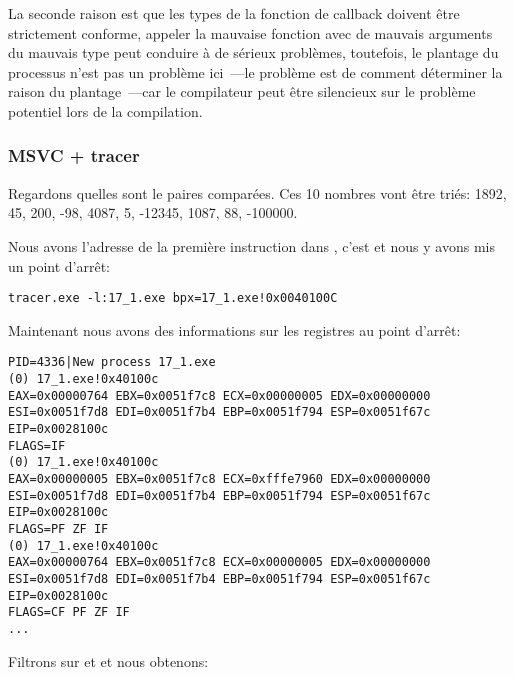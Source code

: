 La seconde raison est que les types de la fonction de callback doivent être strictement
conforme, appeler la mauvaise fonction avec de mauvais arguments du mauvais type peut
conduire à de sérieux problèmes, toutefois, le plantage du processus n'est pas un
problème ici~---le problème est de comment déterminer la raison du plantage~---car
le compilateur peut être silencieux sur le problème potentiel lors de la compilation.



\subsubsection{MSVC + tracer}

Regardons quelles sont le paires comparées.
Ces 10 nombres vont être triés:
1892, 45, 200, -98, 4087, 5, -12345, 1087, 88, -100000.

Nous avons l'adresse de la première instruction \CMP dans \comp, c'est 
et nous y avons mis un point d'arrêt:

\begin{lstlisting}
tracer.exe -l:17_1.exe bpx=17_1.exe!0x0040100C
\end{lstlisting}

Maintenant nous avons des informations sur les registres au point d'arrêt:

\begin{lstlisting}
PID=4336|New process 17_1.exe
(0) 17_1.exe!0x40100c
EAX=0x00000764 EBX=0x0051f7c8 ECX=0x00000005 EDX=0x00000000
ESI=0x0051f7d8 EDI=0x0051f7b4 EBP=0x0051f794 ESP=0x0051f67c
EIP=0x0028100c
FLAGS=IF
(0) 17_1.exe!0x40100c
EAX=0x00000005 EBX=0x0051f7c8 ECX=0xfffe7960 EDX=0x00000000
ESI=0x0051f7d8 EDI=0x0051f7b4 EBP=0x0051f794 ESP=0x0051f67c
EIP=0x0028100c
FLAGS=PF ZF IF
(0) 17_1.exe!0x40100c
EAX=0x00000764 EBX=0x0051f7c8 ECX=0x00000005 EDX=0x00000000
ESI=0x0051f7d8 EDI=0x0051f7b4 EBP=0x0051f794 ESP=0x0051f67c
EIP=0x0028100c
FLAGS=CF PF ZF IF
...
\end{lstlisting}

Filtrons sur  et  et nous obtenons:

